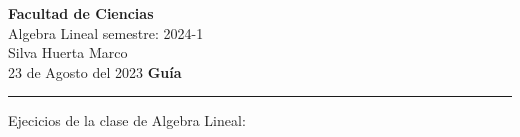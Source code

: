 \documentclass[a4paper,12pt]{article}
\begin{document}
\pagecolor{black}
\color{white}

\thispagestyle{firstpage} %
\noindent
\large\textbf{Facultad de Ciencias} \\
Algebra Lineal                \hfill semestre: 2024-1 \\
Silva Huerta Marco            \hfill  \\ %
23 de Agosto del 2023         \hfill \textbf{Guía}    \\
\noindent\rule{7.3in}{2.8pt}

\vspace{5mm}
\begin{center}
    Ejecicios de la clase de Algebra Lineal:
\end{center}


\end{document}
